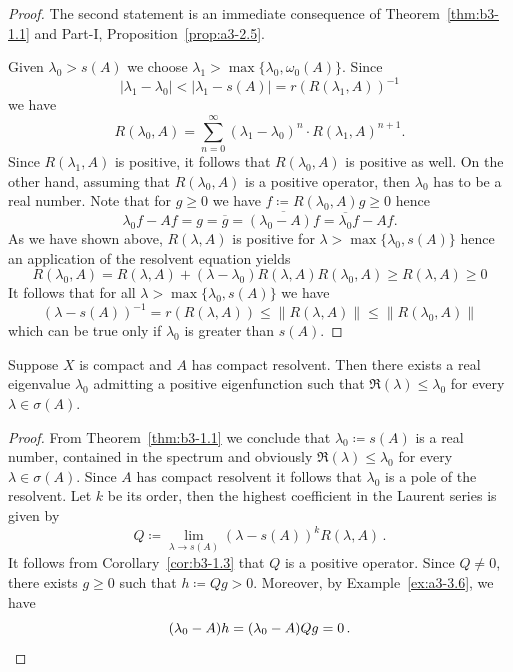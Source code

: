 \begin{proof}
	The second statement is an immediate consequence of Theorem~\ref{thm:b3-1.1} and Part-I, Proposition~\ref{prop:a3-2.5}.
	
	Given $\lambda_0 > s(A)$ we choose $\lambda_1 > \max\{\lambda_0,\omega_{0}(A)\}$.
	Since 
	\[
	\text{$|\lambda_1 - \lambda_0| < |\lambda_1 - s(A)| = r(R(\lambda_1,A))^{-1}$}
	\]
	we have
	\begin{equation}\label{eq:b3-1.10}
		R(\lambda_0,A) = \sum_{n=0}^{\infty} (\lambda_1 - \lambda_0)^n \cdot R(\lambda_1,A)^{n+1}.
	\end{equation}
	Since $R(\lambda_1,A)$ is positive, it follows that $R(\lambda_0,A)$ is positive as well.
	On the other hand, assuming that $R(\lambda_0,A)$ is a positive operator, then $\lambda_0$ has to be a real number.
	Note that for $g \geq 0$ we have $f \coloneqq R(\lambda_0,A)g \geq 0$ hence 
\[
	\lambda_0f - Af = g = \overline{g} = \overline{(\lambda_0 - A)f} = \overline{\lambda_0}f - Af .
\]
%
As we have shown above, $R(\lambda,A)$ is positive for $\lambda > \max\{\lambda_0,s(A)\}$ hence an application of the resolvent equation yields
	\begin{equation}\label{eq:b3-1.11}
		R(\lambda_0,A) = R(\lambda,A) + (\lambda - \lambda_0)R(\lambda,A)R(\lambda_0,A) \geq R(\lambda,A) \geq 0
	\end{equation}
	It follows that for all $\lambda > \max\{\lambda_{0},s(A)\}$ we have
	\begin{equation}\label{eq:b3-1.12}
		(\lambda - s(A))^{-1} = r(R(\lambda,A)) \leq \|R(\lambda,A)\| \leq \|R(\lambda_{0},A)\|
	\end{equation}
	which can be true only if\/ $\lambda_{0}$ is greater than $s(A)$.
\end{proof}
\begin{corollary}\label{cor:b3-1.4}
Suppose $X$ is compact and $A$ has compact resolvent.	
	Then there exists a real eigenvalue $\lambda_{0}$ admitting a positive eigenfunction such that 
	$\Re(\lambda) \leq \lambda_{0}$ for every $\lambda \in \sigma(A)$.
\end{corollary}
\begin{proof}
	From Theorem~\ref{thm:b3-1.1} we conclude that $\lambda_{0} \coloneqq s(A)$ is a real number, contained in the spectrum and obviously $\Re(\lambda) \leq \lambda_{0}$ for every $\lambda \in \sigma(A)$.
	Since $A$ has compact resolvent it follows that $\lambda_{0}$ is a pole of the resolvent.
	Let $k$ be its order, then the highest coefficient in the Laurent series is given by
	\begin{equation}\label{eq:b3-1.13}
		Q \coloneqq \lim_{\lambda \to s(A)} (\lambda - s(A))^{k}R(\lambda,A)\,.
	\end{equation}
It follows from Corollary~\ref{cor:b3-1.3} that $Q$ is a positive operator.
Since $Q \neq 0$, there exists $g \geq 0$ such that $h \coloneqq Qg > 0$.
Moreover, by Example~\ref{ex:a3-3.6}, we have 
%
\[
	 (\lambda_{0} - A)h = (\lambda_{0} - A)Qg = 0\,.
     \qedhere
\]%
%
\end{proof}
